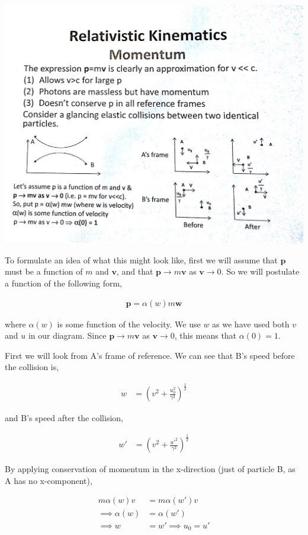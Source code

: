 \documentclass[11pt]{amsart}
\begin{document}
\includegraphics[scale=0.15]{frames}

To formulate an idea of what this might look like, first we will assume that $\mathbf{p}$ must be a function of $m$ and $\mathbf{v}$, and that $\mathbf{p} \to m\mathbf{v}$ as $\mathbf{v} \to 0$. So we will postulate a function of the following form,

\begin{align*}
  \mathbf{p} = \alpha(w) m \mathbf{w}
\end{align*}

where $\alpha(w)$ is some function of the velocity. We use $w$ as we have used both $v$ and $u$ in our diagram. Since $\mathbf{p} \to m\mathbf{v}$ as $\mathbf{v} \to 0$, this means that $\alpha(0) = 1$.

First we will look from A's frame of reference. We can see that B's speed before the collision is,

\begin{align*}
  w &= {\left(v^2 + \frac{u_0^2}{\gamma^2}\right)}^{\frac{1}{2}}
\end{align*}

and B's speed after the collision,

\begin{align*}
  w' &= {\left(v^2 + \frac{u'^2}{\gamma^2}\right)}^{\frac{1}{2}}
\end{align*}

By applying conservation of momentum in the x-direction (just of particle B, as A has no x-component),

\begin{align*}
  m\alpha(w)v &= m\alpha(w')v \\
  \implies \alpha(w) &= \alpha(w') \\
  \implies w &= w' \implies u_0 = u'
\end{align*}
\end{document}
